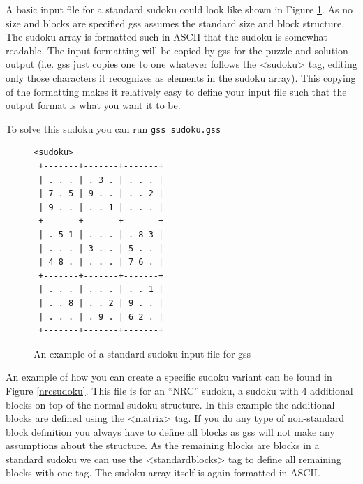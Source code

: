 \documentclass[12pt]{article}
\begin{document}
A basic input file for a standard sudoku could look like shown in Figure \ref{plainsudoku}. As no size and blocks are specified gss assumes the standard size and block structure. The sudoku array is formatted such in ASCII that the sudoku is somewhat readable. The input formatting will be copied by gss for the puzzle and solution output (i.e. gss just copies one to one whatever follows the \textless sudoku\textgreater{} tag, editing only those characters it recognizes as elements in the sudoku array). This copying of the formatting makes it relatively easy to define your input file such that the output format is what you want it to be. 

To solve this sudoku you can run
\texttt{gss sudoku.gss}\\
\begin{figure}
\begin{verbatim}
<sudoku>
 +-------+-------+-------+ 
 | . . . | . 3 . | . . . |
 | 7 . 5 | 9 . . | . . 2 |
 | 9 . . | . . 1 | . . . |
 +-------+-------+-------+ 
 | . 5 1 | . . . | . 8 3 |
 | . . . | 3 . . | 5 . . |
 | 4 8 . | . . . | 7 6 . |
 +-------+-------+-------+ 
 | . . . | . . . | . . 1 |
 | . . 8 | . . 2 | 9 . . |
 | . . . | . 9 . | 6 2 . |
 +-------+-------+-------+
\end{verbatim}
\caption{\label{plainsudoku}An example of a standard sudoku input file for gss}
\end{figure}

An example of how you can create a specific sudoku variant can be found in Figure \ref{nrcsudoku}. This file is for an ``NRC'' sudoku, a sudoku with 4 additional blocks on top of the normal sudoku structure. In this example the additional blocks are defined using the \textless matrix\textgreater{} tag. If you do any type of non-standard block definition you always have to define all blocks as gss will not make any assumptions about the structure. As the remaining blocks are blocks in a standard sudoku we can use the \textless standardblocks\textgreater{} tag to define all remaining blocks with one tag. The sudoku array itself is again formatted in ASCII. 
\end{document}
